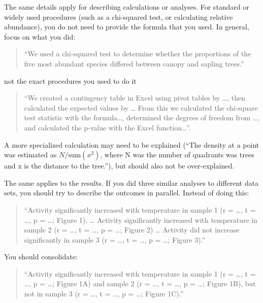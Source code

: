 \documentclass[]{book}
\begin{document}
The same details apply for describing calculations or analyses. For
standard or widely used procedures (such as a chi-squared test, or
calculating relative abundance), you do not need to provide the formula
that you used. In general, focus on what you did:

\begin{quote}
``We used a chi-squared test to determine whether the proportions of the
five most abundant species differed between canopy and sapling trees.''
\end{quote}

not the exact procedures you used to do it

\begin{quote}
``We created a contingency table in Excel using pivot tables by
\ldots{}, then calculated the expected values by \ldots{} From this we
calculated the chi-square test statistic with the formula\ldots{},
determined the degrees of freedom from \ldots{}, and calculated the
p-value with the Excel function\ldots{}''.
\end{quote}

A more specialized calculation may need to be explained (``The density
at a point was estimated as \(N / \text{sum}(x^2)\), where N was the
number of quadrants was trees and x is the distance to the tree.''), but
should also not be over-explained.

The same applies to the results. If you did three similar analyses to
different data sets, you should try to describe the outcomes in
parallel. Instead of doing this:

\begin{quote}
``Activity significantly increased with temperature in sample 1 (r =
\ldots{}, t = \ldots{}, p = \ldots{}; Figure 1). \ldots{} Activity
significantly increased with temperature in sample 2 (r = \ldots{}, t =
\ldots{}, p = \ldots{}; Figure 2) \ldots{} Activity did not increase
significantly in sample 3 (r = \ldots{}, t = \ldots{}, p = \ldots{};
Figure 3).''
\end{quote}

You should consolidate:

\begin{quote}
``Activity significantly increased with temperature in sample 1 (r =
\ldots{}, t = \ldots{}, p = \ldots{}; Figure 1A) and sample 2 (r =
\ldots{}, t = \ldots{}, p = \ldots{}; Figure 1B), but not in sample 3 (r
= \ldots{}, t = \ldots{}, p = \ldots{}; Figure 1C).''
\end{quote}
\end{document}
